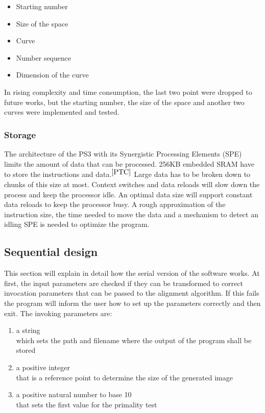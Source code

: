 \begin{itemize}%
   \item Starting number
   \item Size of the space
   \item Curve
   \item Number sequence
   \item Dimension of the curve   
\end{itemize}%

In rising complexity and time consumption, the last two point were dropped to future works, but the starting number, the size of the space and another two curves were implemented and tested.

\subsubsection{Storage}
\label{sec:concurrency}
The architecture of the PS3 with its Synergistic Processing Elements (SPE) limits the amount of data that can be processed. 256KB embedded SRAM have to store the instructions and data.$^{\cite{PTC}}$
Large data has to be broken down to chunks of this size at most. Context switches and data reloads will slow down the process and keep the processor idle. An optimal data size will support constant data reloads to keep the processor busy. A rough approximation of the instruction size, the time needed to move the data and a mechanism to detect an idling SPE is needed to optimize the program.

\subsection{Sequential design}
\label{sec:serial_design}
This section will explain in detail how the serial version of the software works.
At first, the input parameters are checked if they can be transformed to correct invocation parameters that can be passed to the alignment algorithm. If this fails the program will inform the user how to set up the parameters correctly and then exit.
The invoking parameters are:

\begin{enumerate}
   \item a string\\ which sets the path and filename where the output of the program shall be stored
   \item a positive integer\\ that is a reference point to determine the size of the generated image
   \item a positive natural number to base 10\\ that sets the first value for the primality test
\end{enumerate}

